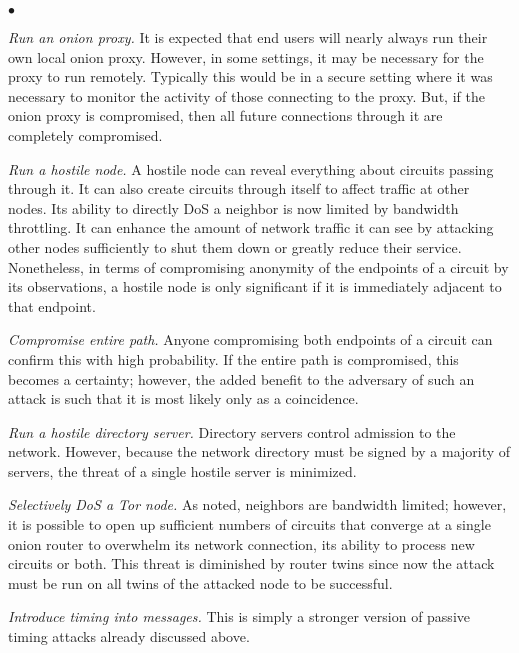 \documentclass[times,10pt,twocolumn]{article}
\newenvironment{tightlist}{\begin{list}{$\bullet$}{
  \setlength{\itemsep}{0mm}
    \setlength{\parsep}{0mm}
    }}{\end{list}}
\begin{document}
\begin{tightlist}
\item \emph{Run an onion proxy.} It is expected that end users will
  nearly always run their own local onion proxy. However, in some
  settings, it may be necessary for the proxy to run remotely.
  Typically this would be in a secure setting where it was necessary
  to monitor the activity of those connecting to the proxy. But, if
  the onion proxy is compromised, then all future connections through
  it are completely compromised.
  
\item \emph{Run a hostile node.} A hostile node can reveal everything
  about circuits passing through it. It can also create circuits
  through itself to affect traffic at other nodes. Its ability to
  directly DoS a neighbor is now limited by bandwidth throttling. It
  can enhance the amount of network traffic it can see by attacking
  other nodes sufficiently to shut them down or greatly reduce their
  service. Nonetheless, in terms of compromising anonymity of the
  endpoints of a circuit by its observations, a hostile node is only
  significant if it is immediately adjacent to that endpoint.
  
\item \emph{Compromise entire path.} Anyone compromising both
  endpoints of a circuit can confirm this with high probability. If
  the entire path is compromised, this becomes a certainty; however,
  the added benefit to the adversary of such an attack is such that it
  is most likely only as a coincidence.
  
\item \emph{Run a hostile directory server.} Directory servers control
  admission to the network. However, because the network directory
  must be signed by a majority of servers, the threat of a single
  hostile server is minimized.
  
\item \emph{Selectively DoS a Tor node.} As noted, neighbors are
  bandwidth limited; however, it is possible to open up sufficient
  numbers of circuits that converge at a single onion router to
  overwhelm its network connection, its ability to process new
  circuits or both. This threat is diminished by router twins since
  now the attack must be run on all twins of the attacked node to be
  successful.

  
\item \emph{Introduce timing into messages.} This is simply a stronger
  version of passive timing attacks already discussed above.
  

\end{tightlist}
\end{document}
